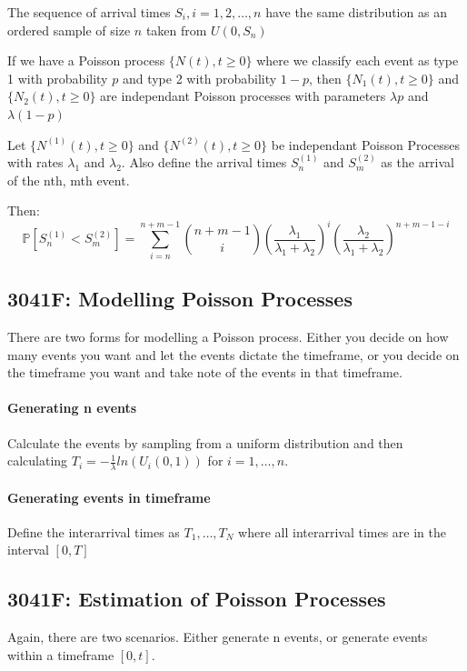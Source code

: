 \documentclass[12pt]{article}
\begin{document}
    The sequence of arrival times \({S_i, i=1, 2, \dots, n}\) have the same distribution as an ordered sample of size \(n\) taken from \(U(0, S_n)\)


    If we have a Poisson process \(\{N(t), t \ge 0\}\) where we classify each event as type 1
    with probability \(p\) and type 2 with probability \(1-p\), then 
    \(\{N_1(t), t \ge 0\}\) and \(\{N_2(t), t \ge 0\}\) are independant Poisson 
    processes with parameters \(\lambda p\) and \(\lambda (1-p)\)


    Let \(\{N^{(1)}(t), t \ge 0\}\) and \(\{N^{(2)}(t), t \ge 0\}\) be independant Poisson 
    Processes with rates \(\lambda_1\) and \(\lambda_2\).
    Also define the arrival times \(S^{(1)}_n\) and \(S^{(2)}_m\) as the arrival of the nth, mth event.

    Then:
    \begin{equation*}
        \mathbb{P}[S^{(1)}_n < S^{(2)}_m] = 
        \sum_{i=n}^{n + m - 1} 
        \binom{n + m - 1}{i} 
        \left( \frac{\lambda_1}{\lambda_1 + \lambda_2} \right)^i 
        \left( \frac{\lambda_2}{\lambda_1 + \lambda_2} \right)^{n + m - 1 - i}
    \end{equation*}
    \subsection{3041F: Modelling Poisson Processes}
    There are two forms for modelling a Poisson process. 
    Either you decide on how many events you want and let the events dictate the timeframe,
    or you decide on the timeframe you want and take note of the events in that timeframe.

    \paragraph{Generating n events} Calculate the events by sampling from a uniform distribution and then calculating \(T_i = -\frac{1}{\lambda} ln(U_i(0,  1))\) for \(i = 1, \dots, n\). 
    \paragraph{Generating events in timeframe} Define the interarrival times as \(T_1, \dots, 
    T_N\) where all interarrival times are in the interval \([0, T]\)
    \subsection{3041F: Estimation of Poisson Processes}
    Again, there are two scenarios. Either generate n events, or generate events within a timeframe \([0, t]\).
\end{document}
